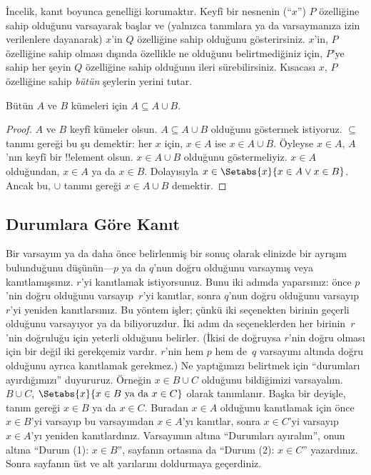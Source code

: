 \documentclass[../../../include/open-logic-section]{subfiles}
\begin{document}
İncelik, kanıt boyunca genelliği korumaktır. Keyfî bir nesnenin
(``$x$'') $P$ özelliğine sahip olduğunu varsayarak başlar ve (yalnızca
tanımlara ya da varsaymanıza izin verilenlere dayanarak) $x$'in $Q$
özelliğine sahip olduğunu gösterirsiniz. $x$'in, $P$ özelliğine sahip
olması dışında özellikle ne olduğunu belirtmediğiniz için, $P$'ye
sahip her şeyin $Q$ özelliğine sahip olduğunu ileri sürebilirsiniz.
Kısacası $x$, $P$ özelliğine sahip \emph{bütün} şeylerin yerini tutar.

\begin{prop}
  Bütün $A$ ve $B$ kümeleri için $A \subseteq A \cup B$.
\end{prop}

\begin{proof}
  $A$ ve $B$ keyfî kümeler olsun. $A \subseteq A \cup B$ olduğunu
  göstermek istiyoruz. $\subseteq$ tanımı gereği bu şu demektir: her
  $x$ için, $x \in A$ ise $x \in A \cup B$. Öyleyse $x \in A$, $A$'nın
  keyfî bir !!{element} olsun. $x \in A \cup B$
  olduğunu göstermeliyiz.
  $x \in A$ olduğundan, $x \in A$ ya da $x \in B$. Dolayısıyla $x \in
  \Setabs{x}{x \in A \lor x \in B}$. Ancak bu, $\cup$ tanımı gereği
  $x \in A \cup B$ demektir.
\end{proof}


\subsection{Durumlara Göre Kanıt}

Bir varsayım ya da daha önce belirlenmiş bir sonuç olarak elinizde bir
ayrışım bulunduğunu düşünün---$p$ ya da $q$'nun doğru olduğunu varsaymış
veya kanıtlamışsınız. $r$'yi kanıtlamak istiyorsunuz. Bunu iki adımda
yaparsınız: önce $p$'nin doğru olduğunu varsayıp~$r$'yi kanıtlar, sonra
$q$'nun doğru olduğunu varsayıp~$r$'yi yeniden kanıtlarsınız. Bu yöntem
işler; çünkü iki seçenekten birinin geçerli olduğunu varsayıyor ya da
biliyoruzdur. İki adım da seçeneklerden her birinin~$r$'nin doğruluğu
  için yeterli olduğunu belirler. (İkisi de doğruysa $r$'nin doğru olması
  için bir değil iki gerekçemiz vardır. $r$'nin hem $p$ hem de~$q$
  varsayımı altında doğru olduğunu ayrıca kanıtlamak gerekmez.) Ne
yaptığımızı belirtmek için ``durumları ayırdığımızı'' duyururuz.
Örneğin $x \in B \cup C$ olduğunu bildiğimizi varsayalım. $B \cup C$,
$\Setabs{x}{x \in B \text{ ya da } x \in C}$ olarak tanımlanır. Başka
bir deyişle, tanım gereği $x \in B$ ya da $x \in C$. Buradan $x \in A$
olduğunu kanıtlamak için önce $x \in B$'yi varsayıp bu varsayımdan $x
\in A$'yı kanıtlar, sonra $x \in C$'yi varsayıp $x \in A$'yı yeniden
kanıtlardınız. Varsayımın altına ``Durumları ayıralım'', onun altına
``Durum (1): $x \in B$'', sayfanın ortasına da ``Durum (2): $x \in C$''
yazardınız. Sonra sayfanın üst ve alt yarılarını doldurmaya geçerdiniz.
\end{document}
